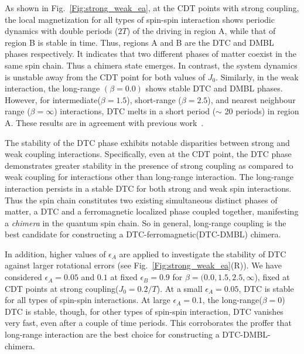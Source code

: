 \documentclass[%
reprint,
superscriptaddress,
amsmath,amssymb,showkeys,
aps,
prb,
]{revtex4-2}
\begin{document}
	As shown in Fig.~\ref{Fig:strong_weak_ea}, at the CDT points with strong coupling, the local magnetization for all types of spin-spin interaction shows periodic dynamics with double periods ($2T$) of the driving in region A, while that of region B is stable in time. Thus, regions A and B are the DTC and DMBL phases respectively. It indicates that two different phases of matter coexist in the same spin chain. Thus a chimera state emerges. In contrast, the system dynamics is unstable away from the CDT point for both values of $J_0$. Similarly, in the weak interaction, the long-range $(\beta=0.0)$ shows stable DTC and DMBL phases. However, for intermediate($\beta = 1.5$), short-range ($\beta = 2.5$), and nearest neighbour range ($\beta = \infty$) interactions, DTC melts in a short period ($\sim$ 20 periods) in region A. These results are in agreement with previous work~\cite{sakurai_phys_nodate}.
		
	The stability of the DTC phase exhibits notable disparities between strong and weak coupling interactions. Specifically, even at the CDT point, the DTC phase demonstrates greater stability in the presence of strong coupling as compared to weak coupling for interactions other than long-range interaction. The long-range interaction persists in a stable DTC for both strong and weak spin interactions. Thus the spin chain constitutes two existing simultaneous distinct phases of matter, a DTC and a ferromagnetic localized phase coupled together, manifesting a \textit{chimera} in the quantum spin chain. So in general, long-range coupling is the best candidate for constructing a DTC-ferromagnetic(DTC-DMBL) chimera.
	
	In addition, higher values of $\epsilon_A$ are applied to investigate the stability of DTC against larger rotational errors (see Fig.~\ref{Fig:strong_weak_ea}(R)). We have considered $\epsilon_A = 0.05$  and $0.1$ at fixed $\epsilon_B = 0.9$ for $\beta = (0.0, 1.5, 2.5, \infty$), fixed at CDT points at strong coupling($J_0 = 0.2/T$). At a small $\epsilon_A=0.05$, DTC is stable for all types of spin-spin interactions. At large $\epsilon_A = 0.1$, the long-range($\beta=0$) DTC is stable, though, for other types of spin-spin interaction, DTC vanishes very fast, even after a couple of time periods. This corroborates the proffer that long-range interaction are the best choice for constructing a DTC-DMBL-chimera. 
	
\end{document}
